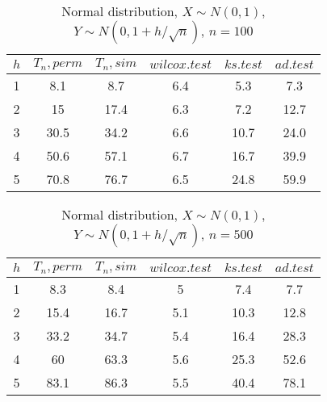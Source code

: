 \documentclass{svproc}
\begin{document}
\begin{table}
  \caption{Normal distribution, $X\sim N(0,1)$, $Y\sim N(0, 1 + h/\sqrt{n})$, $n=100$}
  \begin{center}
  \begin{tabular}{c@{\quad}c@{\quad}c@{\quad}c@{\quad}c@{\quad}c}
  \hline
  $h$ & $T_n, perm$ & $T_n, sim$ & $wilcox.test$ & $ks.test$ & $ad.test$ \\
  \hline
  1 & 8.1 & 8.7 & 6.4 & 5.3 & 7.3 \\
  2 & 15 & 17.4 & 6.3 & 7.2 & 12.7 \\
  3 & 30.5 & 34.2 & 6.6 & 10.7 & 24.0 \\
  4 & 50.6 & 57.1 & 6.7 & 16.7 & 39.9 \\
  5 & 70.8 & 76.7 & 6.5 & 24.8 & 59.9 \\
  \hline
  \end{tabular}
  \end{center}
\end{table}

\begin{table}
  \caption{Normal distribution, $X\sim N(0,1)$, $Y\sim N(0, 1 + h/\sqrt{n})$, $n=500$}
  \begin{center}
  \begin{tabular}{c@{\quad}c@{\quad}c@{\quad}c@{\quad}c@{\quad}c}
  \hline
  $h$ & $T_n, perm$ & $T_n, sim$ & $wilcox.test$ & $ks.test$ & $ad.test$ \\
  \hline
  1 & 8.3 & 8.4 & 5 & 7.4 & 7.7\\
  2 & 15.4 & 16.7 & 5.1 & 10.3 & 12.8 \\
  3 & 33.2 & 34.7 & 5.4 & 16.4 & 28.3 \\
  4 & 60 & 63.3 & 5.6 & 25.3 & 52.6 \\
  5 & 83.1 & 86.3 & 5.5 & 40.4 & 78.1 \\
  \hline
  \end{tabular}
  \end{center}
\end{table}
\end{document}
